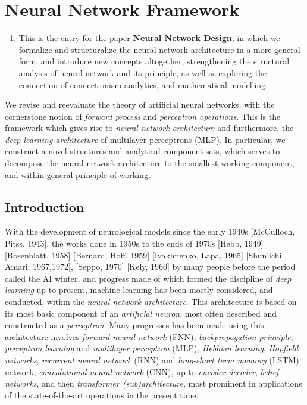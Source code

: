 \chapter{Neural Network Framework}

\begin{enumerate}[leftmargin=2cm,topsep=0pt]
  \item[Information] This is the entry for the paper \textbf{Neural Network Design}, in which we formalize and structuralize the neural network architecture in a more general form, and introduce new concepts altogether, strengthening the structural analysis of neural network and its principle, as well as exploring the connection of connectionism analytics, and mathematical modelling. 
\end{enumerate}

We revise and reevaluate the theory of artificial neural networks, with the cornerstone notion of \textit{forward process} and \textit{perceptron operations}. This is the framework which gives rise to \textit{neural network architecture} and furthermore, the \textit{deep learning architecture} of multilayer perceptrons (MLP). In particular, we construct a novel structures and analytical component sets, which serves to decompose the neural network architecture to the smallest working component, and within general principle of working. 

\section{Introduction}

With the development of neurological models since the early 1940s [McCulloch, Pitss, 1943], the works done in 1950s to the ends of 1970s [Hebb, 1949] [Rosenblatt, 1958] [Bernard, Hoff, 1959] [Ivakhnenko, Lapa, 1965] [Shun'ichi Amari, 1967,1972], [Seppo, 1970] [Kely, 1960] by many people before the period called the AI winter, and progress made of which formed the discipline of \textit{deep learning} up to present, machine learning has been mostly considered, and conducted, within the \textit{neural network architecture}. This architecture is based on its most basic component of an \textit{artificial neuron}, most often described and constructed as a \textit{perceptron}. Many progresses has been made using this architecture involves \textit{forward neural network} (FNN), \textit{backpropagation principle}, \textit{perceptron learning} and \textit{multilayer perceptron} (MLP), \textit{Hebbian learning}, \textit{Hopfield networks}, \textit{recurrent neural network} (RNN) and \textit{long-short term memory} (LSTM) network, \textit{convolutional neural network} (CNN), up to \textit{encoder-decoder}, \textit{belief networks}, and then \textit{transformer (sub)architecture}, most prominent in applications of the state-of-the-art operations in the present time. 

